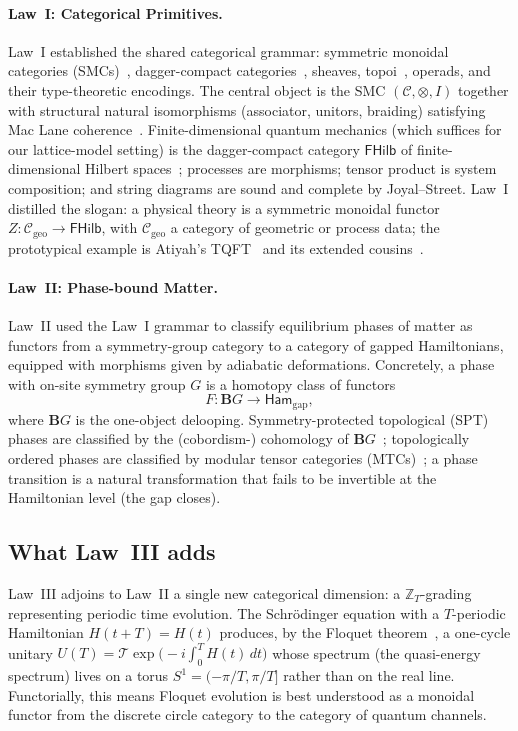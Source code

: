 \documentclass[12pt]{article}
\theoremstyle{definition}
\theoremstyle{remark}
\newcommand{\C}{\mathcal{C}}
\newcommand{\Ham}{\mathsf{Ham}}
\begin{document}
\paragraph{Law~I: Categorical Primitives.} Law~I established the shared categorical grammar: symmetric monoidal categories (SMCs)~\cite{maclane1998}, dagger-compact categories~\cite{abramsky2004}, sheaves, topoi~\cite{lurie2009}, operads, and their type-theoretic encodings. The central object is the SMC $(\C,\otimes,I)$ together with structural natural isomorphisms (associator, unitors, braiding) satisfying Mac Lane coherence~\cite{maclane1998}. Finite-dimensional quantum mechanics (which suffices for our lattice-model setting) is the dagger-compact category $\mathsf{FHilb}$ of finite-dimensional Hilbert spaces~\cite{abramsky2004}; processes are morphisms; tensor product is system composition; and string diagrams are sound and complete by Joyal--Street. Law~I distilled the slogan: a physical theory is a symmetric monoidal functor $Z\colon \C_{\mathrm{geo}} \to \mathsf{FHilb}$, with $\C_{\mathrm{geo}}$ a category of geometric or process data; the prototypical example is Atiyah's TQFT~\cite{atiyah1988} and its extended cousins~\cite{baezdolan1995}.

\paragraph{Law~II: Phase-bound Matter.} Law~II used the Law~I grammar to classify equilibrium phases of matter as functors from a symmetry-group category to a category of gapped Hamiltonians, equipped with morphisms given by adiabatic deformations. Concretely, a phase with on-site symmetry group $G$ is a homotopy class of functors
\begin{equation}
F\colon \mathbf{B}G \longrightarrow \Ham_{\mathrm{gap}},
\end{equation}
where $\mathbf{B}G$ is the one-object delooping. Symmetry-protected topological (SPT) phases are classified by the (cobordism-) cohomology of $\mathbf{B}G$~\cite{chen2013}; topologically ordered phases are classified by modular tensor categories (MTCs)~\cite{kitaev2003,wen2004}; a phase transition is a natural transformation that fails to be invertible at the Hamiltonian level (the gap closes).

\subsection{What Law~III adds}

Law~III adjoins to Law~II a single new categorical dimension: a $\mathbb{Z}_T$-grading representing periodic time evolution. The Schr\"odinger equation with a $T$-periodic Hamiltonian $H(t+T)=H(t)$ produces, by the Floquet theorem~\cite{floquet1883,shirley1965}, a one-cycle unitary $U(T)= \mathcal{T}\exp\bigl(-i\!\int_0^T H(t)\,dt\bigr)$ whose spectrum (the quasi-energy spectrum) lives on a torus $S^1=(-\pi/T,\pi/T]$ rather than on the real line. Functorially, this means Floquet evolution is best understood as a monoidal functor from the discrete circle category to the category of quantum channels.
\end{document}
